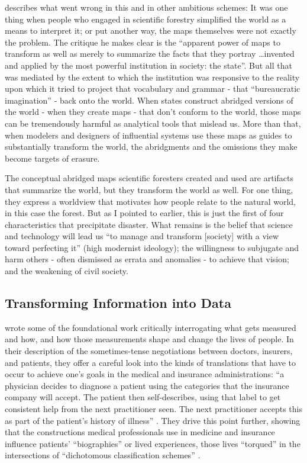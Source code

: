 \documentclass[manuscript,screen]{acmart}
\begin{document}
\citeauthor{scott1998seeing} describes what went wrong in this and in other ambitious schemes: It was one thing when people who engaged in scientific forestry simplified the world as a means to interpret it;
or put another way, the maps themselves were not exactly the problem.
The critique he makes clear is the ``apparent power of maps to transform as well as merely to summarize the facts that they portray \dots invented and applied by the most powerful institution in society: the state''.
But all that was mediated by the extent to which the institution was responsive to the reality upon which it tried to project that vocabulary and grammar - that ``bureaucratic imagination''
\cite{nuimeprn1123} - back onto the world.
When states construct abridged versions of the world - when they create maps - that don't conform to the world, those maps can be tremendously harmful as analytical tools that mislead us.
More than that, when modelers and designers of influential systems use these maps as guides to substantially transform the world, the abridgments and the omissions they make become targets of erasure.

The conceptual abridged maps scientific foresters created and used are artifacts that summarize the world, but they transform the world as well.
For one thing, they express a worldview that motivates how people relate to the natural world, in this case the forest.
But as I pointed to earlier, this is just the first of four characteristics that precipitate disaster.
What remains is the belief that science and technology will lead us ``to manage and transform [society] with a view toward perfecting it'' (high modernist ideology);
the willingness to subjugate and harm others - often dismissed as errata and anomalies - to achieve that vision;
and the weakening of civil society.

\subsection{Transforming Information into Data}

\citeauthor{bowker2000sorting} wrote some of the foundational work critically interrogating what gets measured and how, and how those measurements shape and change the lives of people.
In their description of the sometimes-tense negotiations between doctors, insurers, and patients, they offer a careful look into the kinds of translations that have to occur to achieve one's goals in the medical and insurance administrations:
``a physician decides to diagnose a patient using the categories that the insurance company will accept.
The patient then self-describes, using that label to get consistent help from the next practitioner seen.
The next practitioner accepts this as part of the patient's history of illness''
\cite{bowker2000sorting}.
They drive this point further, showing that the constructions medical professionals use in medicine and insurance influence patients' ``biographies'' or lived experiences, those lives ``torqued'' in the intersections of ``dichotomous classification schemes''
\cite{bowker2000sorting}.
\end{document}
